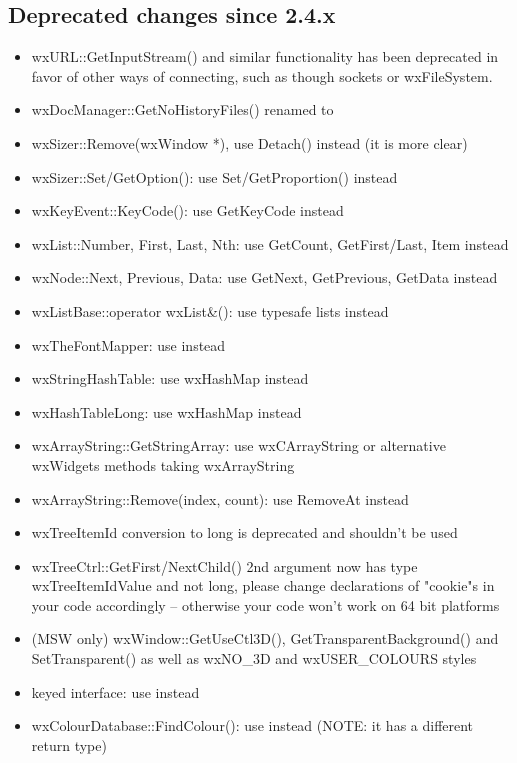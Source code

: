 \subsection{Deprecated changes since 2.4.x}\label{deprecatedsince24}
\begin{itemize}\itemsep=0pt
\item wxURL::GetInputStream() and similar functionality has been deprecated in favor of other ways of connecting, such as though sockets or wxFileSystem.
\item wxDocManager::GetNoHistoryFiles() renamed to 
\item wxSizer::Remove(wxWindow *), use Detach() instead (it is more clear)
\item wxSizer::Set/GetOption(): use Set/GetProportion() instead
\item wxKeyEvent::KeyCode(): use GetKeyCode instead
\item wxList::Number, First, Last, Nth: use GetCount, GetFirst/Last, Item instead
\item wxNode::Next, Previous, Data: use GetNext, GetPrevious, GetData instead
\item wxListBase::operator wxList\&(): use typesafe lists instead
\item wxTheFontMapper: use  instead
\item wxStringHashTable: use wxHashMap instead
\item wxHashTableLong: use wxHashMap instead
\item wxArrayString::GetStringArray: use wxCArrayString or alternative wxWidgets methods taking wxArrayString
\item wxArrayString::Remove(index, count): use RemoveAt instead
\item wxTreeItemId conversion to long is deprecated and shouldn't be used
\item wxTreeCtrl::GetFirst/NextChild() 2nd argument now has type wxTreeItemIdValue and not long, please change declarations of "cookie"s in your code accordingly -- otherwise your code won't work on 64 bit platforms
\item (MSW only) wxWindow::GetUseCtl3D(), GetTransparentBackground() and SetTransparent() as well as wxNO\_3D and wxUSER\_COLOURS styles
\item {} keyed interface: use  instead
\item wxColourDatabase::FindColour(): use  instead (NOTE: it has a different return type)

\end{itemize}
